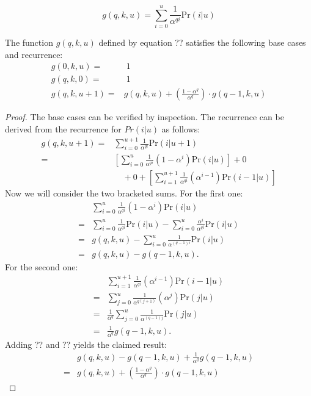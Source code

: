 \documentclass{sig-alternate}
\begin{document}
\begin{equation}
g(q,k,u) = \sum_{i=0}^u \frac{1}{\alpha^{qi}} \mathrm{Pr}(i|u)
\end{equation}


 The function $g(q,k,u)$ defined by equation ??
satisfies the following base cases and recurrence:
\begin{align}
g(0,k,u) = & \;1 \\
g(q,k,0) = & \;1 \\
g(q,k,u\!+\!1) = & g(q,k,u) + \left(\frac{1-\alpha^q}{\alpha^q}\right) \cdot g(q\!-\!1,k,u)
\end{align}
\begin{proof}
The base cases can be verified by inspection. The recurrence can be derived from the
recurrence for $Pr(i|u)$ as follows:
\begin{align} 
  g(q,k,u\!+\!1)
= & \sum_{i=0}^{u+1} \frac{1}{\alpha^{qi}} \mathrm{Pr}(i|u+1) \\
= & \left[ \sum_{i=0}^{u} \frac{1}{\alpha^{qi}} (1-\alpha^i) \mathrm{Pr}(i|u) \right] + 0 \\
  & \quad + 0 + \left[ \sum_{i=1}^{u+1} \frac{1}{\alpha^{qi}} (\alpha^{i-1}) \mathrm{Pr}(i\!-\!1|u) \right]
\end{align} 
\noindent Now we will consider the two bracketed sums. For the first one:
\begin{align} 
  & \sum_{i=0}^{u} \frac{1}{\alpha^{qi}} (1-\alpha^i) \mathrm{Pr}(i|u) \\
= & \sum_{i=0}^u \frac{1}{\alpha^{qi}} \mathrm{Pr}(i|u) - \sum_{i=0}^u \frac{\alpha^i}{\alpha^{qi}} \mathrm{Pr}(i|u) \\
= & g(q,k,u) - \sum_{i=0}^u \frac{1}{\alpha^{(q-1)i}} \mathrm{Pr}(i|u) \\
= & g(q,k,u) - g(q-1,k,u).
\end{align}
\noindent For the second one: %
\begin{align} 
  & \sum_{i=1}^{u+1} \frac{1}{\alpha^{qi}} (\alpha^{i-1}) \mathrm{Pr}(i\!-\!1|u) \\
= & \sum_{j=0}^{u} \frac{1}{\alpha^{q(j+1)}} (\alpha^{j}) \mathrm{Pr}(j|u) \\
= & \frac{1}{\alpha^q}\sum_{j=0}^{u} \frac{1}{\alpha^{(q-1)j}} \mathrm{Pr}(j|u) \\
= & \frac{1}{\alpha^q} g(q-1,k,u).
\end{align}
\noindent Adding ?? and ?? yields the claimed result:
\begin{align} 
  & g(q,k,u) - g(q-1,k,u) + \frac{1}{\alpha^q} g(q-1,k,u) \\
= & g(q,k,u) + \left(\frac{1-\alpha^q}{\alpha^q}\right) \cdot g(q\!-\!1,k,u)
\end{align}
\end{proof}
\end{document}
